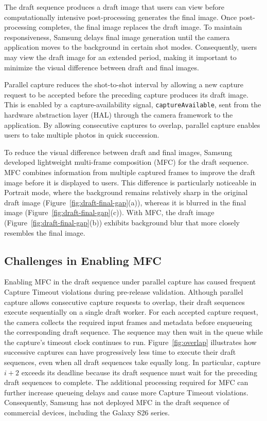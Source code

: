 The draft sequence produces a draft image that users can view before computationally intensive post-processing generates the final image.
Once post-processing completes, the final image replaces the draft image.
To maintain responsiveness, Samsung delays final image generation until the camera application moves to the background in certain shot modes.
Consequently, users may view the draft image for an extended period, making it important to minimize the visual difference between draft and final images.

Parallel capture reduces the shot-to-shot interval by allowing a new capture request to be accepted before the preceding capture produces its draft image.
This is enabled by a capture-availability signal, \texttt{captureAvailable}, sent from the hardware abstraction layer (HAL) through the camera framework to the application.
By allowing consecutive captures to overlap, parallel capture enables users to take multiple photos in quick succession.

To reduce the visual difference between draft and final images, Samsung developed lightweight multi-frame composition (MFC) for the draft sequence.
MFC combines information from multiple captured frames to improve the draft image before it is displayed to users.
This difference is particularly noticeable in Portrait mode, where the background remains relatively sharp in the original draft image (Figure~\ref{fig:draft-final-gap}(a)), whereas it is blurred in the final image (Figure~\ref{fig:draft-final-gap}(c)).
With MFC, the draft image (Figure~\ref{fig:draft-final-gap}(b)) exhibits background blur that more closely resembles the final image.

\subsection{Challenges in Enabling MFC}
\label{sec:capture-timeout-risk}
\label{sec:guard-limit}

Enabling MFC in the draft sequence under parallel capture has caused frequent Capture Timeout violations during pre-release validation.
Although parallel capture allows consecutive capture requests to overlap, their draft sequences execute sequentially on a single draft worker.
For each accepted capture request, the camera collects the required input frames and metadata before enqueueing the corresponding draft sequence. The sequence may then wait in the queue while the capture's timeout clock continues to run.
Figure~\ref{fig:overlap} illustrates how successive captures can have progressively less time to execute their draft sequences, even when all draft sequences take equally long.
In particular, capture $i+2$ exceeds its deadline because its draft sequence must wait for the preceding draft sequences to complete.
The additional processing required for MFC can further increase queueing delays and cause more Capture Timeout violations.
Consequently, Samsung has not deployed MFC in the draft sequence of commercial devices, including the Galaxy S26 series.

